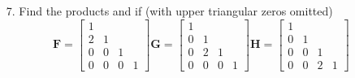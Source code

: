 \begin{itemize}
\begin{itemize}
      \item[7.] Find the products  and  if (with upper
        triangular zeros omitted)
        \[%
        \bm{F} = \begin{bmatrix}
          1 &  &  \\
          2 & 1 &  \\
          0 & 0 & 1 \\
          0 & 0 & 0 & 1
        \end{bmatrix}
        \bm{G} = \begin{bmatrix}
          1 &  &  \\
          0 & 1 &  \\
          0 & 2 & 1 \\
          0 & 0 & 0 & 1
        \end{bmatrix}
        \bm{H} = \begin{bmatrix}
          1 &  &  \\
          0 & 1 &  \\
          0 & 0 & 1 \\
          0 & 0 & 2 & 1
        \end{bmatrix}
        \]%
       \fg{\[
         \bm{FGH} =
         \begin{bmatrix}
           1 & 0 & 0 & 0 \\
           2 & 1 & 0 & 0 \\
           0 & 2 & 1 & 0 \\
           0 & 0 & 2 & 1
         \end{bmatrix} \quad
         \bm{HGF} =
         \begin{bmatrix}
           1 & 0 & 0 & 0 \\
           2 & 1 & 0 & 0 \\
           4 & 2 & 1 & 0 \\
           8 & 4 & 2 & 1
         \end{bmatrix} \quad
       \]}


\end{itemize}
\end{itemize}
